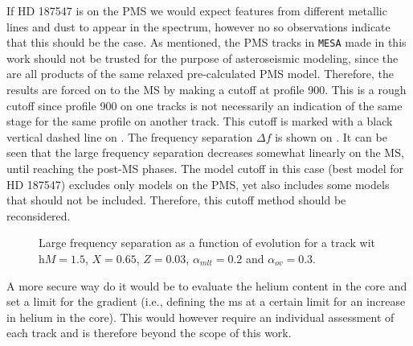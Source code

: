 If HD 187547 is on the PMS we would expect features from different metallic lines and dust to appear in the spectrum, however no so observations indicate that this should be the case. As mentioned, the PMS tracks in \texttt{MESA} made in this work should not be trusted for  the purpose of asteroseismic modeling, since the are all products of the same relaxed pre-calculated PMS model. Therefore, the results are forced on to the MS by making a cutoff at profile 900. This is a rough cutoff since profile 900 on one tracks is not necessarily an indication of the same stage for the same profile on another track. This cutoff is marked with a black vertical dashed line on . The frequency separation $\Delta f$ is shown on . It can be seen that the large frequency separation decreases somewhat linearly on the MS, until reaching the post-MS phases. The model cutoff in this case (best model for HD 187547) excludes only models on the PMS, yet also includes some models that should not be included. Therefore, this cutoff method should be reconsidered. 

\begin{figure}[htbp]
	\centering
	\caption{Large frequency separation as a function of evolution for a track wit h$M=1.5$\msun, $X=0.65$, $Z=0.03$, $\alpha_{mlt}=0.2$ and $\alpha_{ov}=0.3$.}
	\label{plotfreqsastime}
\end{figure}

 A more secure way do it would be to evaluate the helium content in the core and set a limit for the gradient (i.e., defining the ms at a certain limit for an increase in helium in the core). This would however require an individual assessment of each track and is therefore beyond the scope of this work. 

